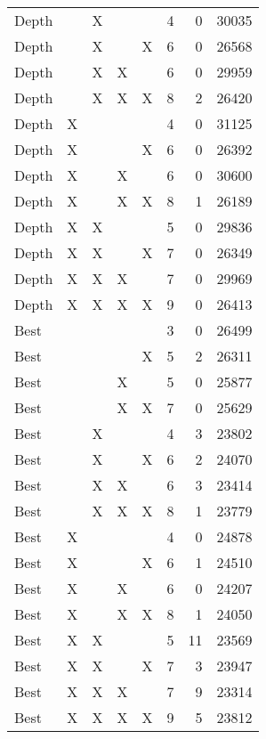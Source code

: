 \begin{tabular}{lllllrrr}
      Depth &    &  X &    &    &        4 &       0 &      30035 \\
      Depth &    &  X &    &  X &        6 &       0 &      26568 \\
      Depth &    &  X &  X &    &        6 &       0 &      29959 \\
      Depth &    &  X &  X &  X &        8 &       2 &      26420 \\
      Depth &  X &    &    &    &        4 &       0 &      31125 \\
      Depth &  X &    &    &  X &        6 &       0 &      26392 \\
      Depth &  X &    &  X &    &        6 &       0 &      30600 \\
      Depth &  X &    &  X &  X &        8 &       1 &      26189 \\
      Depth &  X &  X &    &    &        5 &       0 &      29836 \\
      Depth &  X &  X &    &  X &        7 &       0 &      26349 \\
      Depth &  X &  X &  X &    &        7 &       0 &      29969 \\
      Depth &  X &  X &  X &  X &        9 &       0 &      26413 \\
       Best &    &    &    &    &        3 &       0 &      26499 \\
       Best &    &    &    &  X &        5 &       2 &      26311 \\
       Best &    &    &  X &    &        5 &       0 &      25877 \\
       Best &    &    &  X &  X &        7 &       0 &      25629 \\
       Best &    &  X &    &    &        4 &       3 &      23802 \\
       Best &    &  X &    &  X &        6 &       2 &      24070 \\
       Best &    &  X &  X &    &        6 &       3 &      23414 \\
       Best &    &  X &  X &  X &        8 &       1 &      23779 \\
       Best &  X &    &    &    &        4 &       0 &      24878 \\
       Best &  X &    &    &  X &        6 &       1 &      24510 \\
       Best &  X &    &  X &    &        6 &       0 &      24207 \\
       Best &  X &    &  X &  X &        8 &       1 &      24050 \\
       Best &  X &  X &    &    &        5 &      11 &      23569 \\
       Best &  X &  X &    &  X &        7 &       3 &      23947 \\
       Best &  X &  X &  X &    &        7 &       9 &      23314 \\
       Best &  X &  X &  X &  X &        9 &       5 &      23812 \\
\bottomrule
\end{tabular}
\unskip